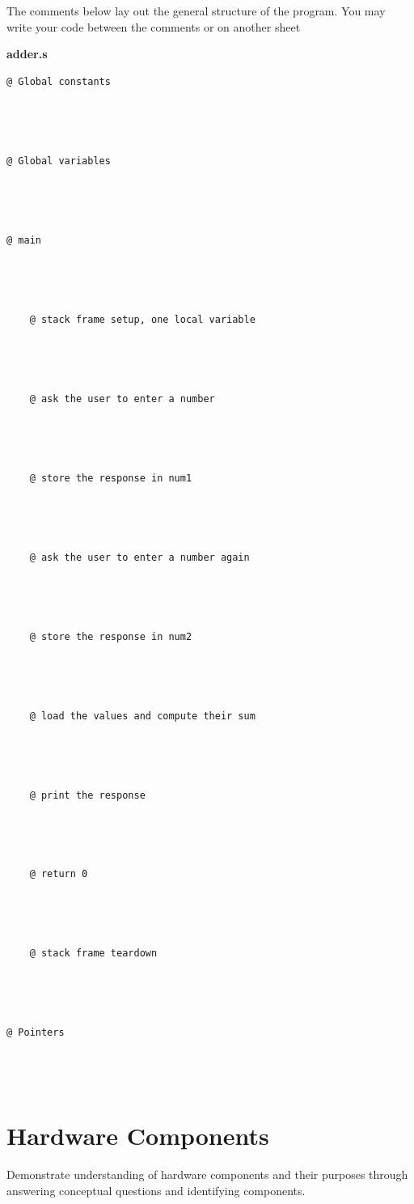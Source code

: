 \documentclass[12pt]{article}
\begin{document}
The comments below lay out the general structure of the program. You may write your code between the comments or on another sheet

\newpage 

\textbf{adder.s}

\begin{verbatim}
@ Global constants




@ Global variables




@ main




    @ stack frame setup, one local variable



     
    @ ask the user to enter a number



     
    @ store the response in num1



     
    @ ask the user to enter a number again



     
    @ store the response in num2




    @ load the values and compute their sum




    @ print the response



     
    @ return 0




    @ stack frame teardown




@ Pointers




\end{verbatim}

\vfill

\standardsfooter

\newpage



\section*{Hardware Components}

Demonstrate understanding of hardware components and their purposes through answering conceptual questions and identifying components.
\end{document}
